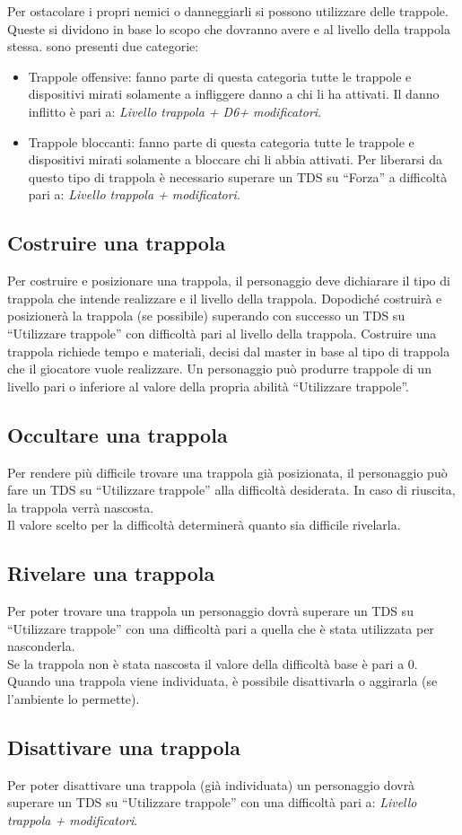 \documentclass[../manuale_main.tex]{subfiles}
\begin{document}
Per ostacolare i propri nemici o danneggiarli si possono utilizzare delle trappole.
Queste si dividono in base lo scopo che dovranno avere e al livello della trappola stessa.
sono presenti due categorie:
\begin{itemize}
\item Trappole offensive: fanno parte di questa categoria tutte le trappole e dispositivi mirati solamente a infliggere danno a chi li ha attivati. Il danno inflitto è pari a: \textit{Livello trappola + D6+ modificatori}.
\item Trappole bloccanti: fanno parte di questa categoria tutte le trappole e dispositivi mirati solamente a bloccare chi li abbia attivati. Per liberarsi da questo tipo di trappola è necessario superare un TDS su ``Forza'' a difficoltà pari a: \textit{Livello trappola + modificatori}.
\end{itemize}

\subsection{Costruire una trappola}
Per costruire e posizionare una trappola, il personaggio deve dichiarare il tipo di trappola che intende realizzare e il livello della trappola. Dopodiché costruirà e posizionerà la trappola (se possibile) superando con successo un TDS su ``Utilizzare trappole'' con difficoltà pari al livello della trappola.
Costruire una trappola richiede tempo e materiali, decisi dal master in base al tipo di trappola che il giocatore vuole realizzare.
Un personaggio può produrre trappole di un livello pari o inferiore al valore della propria abilità ``Utilizzare trappole”.

\subsection{Occultare una trappola}
Per rendere più difficile trovare una trappola già posizionata, il personaggio può fare un TDS su “Utilizzare trappole'' alla difficoltà desiderata. In caso di riuscita, la trappola verrà nascosta.\\
Il valore scelto per la difficoltà determinerà quanto sia difficile rivelarla.

\subsection{Rivelare una trappola}
Per poter trovare una trappola un personaggio dovrà superare un TDS su ``Utilizzare trappole'' con una difficoltà pari a quella che è stata utilizzata per nasconderla.\\
Se la trappola non è stata nascosta il valore della difficoltà base è pari a 0.\\
Quando una trappola viene individuata, è possibile disattivarla o aggirarla (se l'ambiente lo permette).

\subsection{Disattivare una trappola}
Per poter disattivare una trappola (già individuata) un personaggio dovrà superare un TDS su ``Utilizzare trappole'' con una difficoltà pari a: \textit{Livello trappola + modificatori}.
\end{document}
